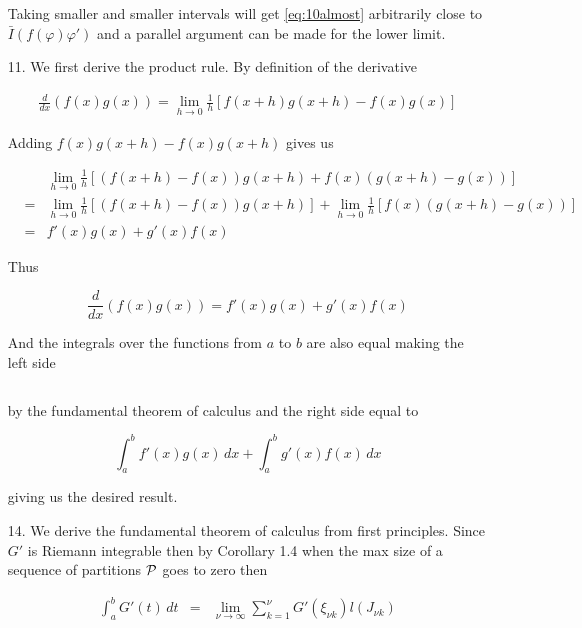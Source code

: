 \documentclass[oneside]{book}
\begin{document}
\begin{enumerate}
Taking smaller and smaller intervals will get \ref{eq:10almost} arbitrarily close to $\bar{I}(f(\varphi)\varphi')$ and a parallel argument can be made for the lower limit.

\item[11.] We first derive the product rule. By definition of the derivative

\begin{eqnarray}
\frac{d}{dx} (f(x) g(x)) = \lim_{h \to 0} \frac{1}{h} [f(x+h)g(x+h) - f(x)g(x)]
\end{eqnarray} 

Adding $f(x)g(x+h)-f(x)g(x+h)$ gives us

\begin{eqnarray}
&&\lim_{h \to 0} \frac{1}{h} [(f(x+h)-f(x))g(x+h) + f(x)(g(x+h)-g(x))] \nonumber \\
&=& \lim_{h \to 0} \frac{1}{h} [(f(x+h)-f(x))g(x+h)] + \lim_{h \to 0} \frac{1}{h} [f(x)(g(x+h)-g(x))] \nonumber \\
&=& f'(x)g(x) + g'(x)f(x)
\end{eqnarray} 

Thus 

\begin{equation}
\frac{d}{dx} (f(x) g(x)) = f'(x)g(x) + g'(x)f(x)
\end{equation}

And the integrals over the functions from $a$ to $b$ are also equal making the left side

\begin{equation}
[f(b)g(b)-f(a)g(a)]
\end{equation}

by the fundamental theorem of calculus and the right side equal to

\begin{equation}
\int_a^b f'(x)g(x)\, dx + \int_a^b g'(x)f(x)\,dx
\end{equation}

giving us the desired result.

\item[14.] We derive the fundamental theorem of calculus from first principles. Since $G'$ is Riemann integrable then by Corollary 1.4 when the max size of a sequence of partitions $\cal{P}$ goes to zero then

\begin{eqnarray}
\int_a^b G'(t)\,dt &=& \lim_{\nu \to \infty} \sum_{k=1}^\nu G'(\xi_{\nu k}) l(J_{\nu k})
\end{eqnarray}


\end{enumerate}
\end{document}
